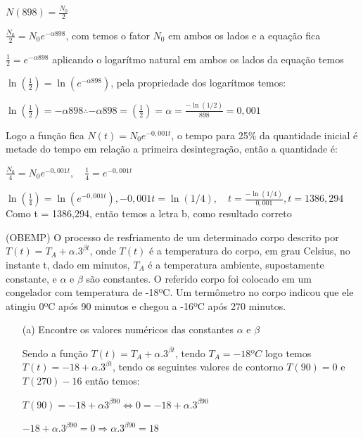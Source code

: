 \begin{multicols*}{2}
    $N(898) = \frac{N_0}{2}$

    $\frac{N_0}{2} = N_0 e^{- \alpha 898}$, com temos o fator $N_0$ em ambos os lados e a equação 			fica

    $\frac{1}{2} = e^{- \alpha 898}$ aplicando o logarítmo natural em ambos os lados da equação 			temos

    $\ln \left(\frac{1}{2} \right) = \ln \left( e^{- \alpha 898} \right)$, pela propriedade dos 			logarítmos temos:

    $\ln \left(\frac{1}{2} \right) =  - \alpha 898  \therefore
        - \alpha 898 =  \left(\frac{1}{2} \right) = \alpha = \frac{-\ln(1/2)}{898} = 0,001$

    Logo a função fica $N(t) = N_0 e^{-0,001t}$, o tempo para 25\% da quantidade inicial é metade 			do tempo em relação a primeira desintegração, então a quantidade é:



    $\frac{N_0}{4} = N_0 e^{-0,001 t}, \quad \frac{1}{4} = e^{-0,001t}$

    $\ln \left( \frac{1}{4} \right) = \ln \left( e^{-0,001t} \right),
        -0,001t = \ln( 1/4), \quad t = \frac{ - \ln( 1/4)}{ 0,001}, t = 1386,294
    $
    Como t = 1386,294, então temos a letra b, como resultado correto


    (OBEMP) O processo de resfriamento de um determinado corpo descrito por
    $T(t) = T_A + \alpha.3^{\beta t}$, onde $T(t)$ é a temperatura do corpo, em grau Celsius, no 			instante t, dado em minutos, $T_A$ é a temperatura ambiente, supostamente constante, e $\alpha$
    e $\beta$ são constantes. O referido corpo foi colocado em um congelador com temperatura de 			-18ºC. Um termômetro no corpo indicou que ele atingiu 0ºC após 90 minutos e chegou a 					-16ºC após 270 minutos.
    \begin{itemize}
        \item[(a)] Encontre os valores numéricos das constantes $\alpha$ e $\beta$

              Sendo a função $T(t) = T_A + \alpha.3^{\beta t}$, tendo $T_A = -18ºC$ logo temos
              $T(t) = -18 + \alpha.3^{\beta t}$, tendo os seguintes valores de contorno $T(90) = 0$ e
              $T(270) -16$ então temos:

              $T(90) = -18 + \alpha 3^{\beta 90} \Leftrightarrow 0 = -18 + \alpha .3^{\beta 90}$

              $-18 + \alpha .3^{\beta 90} = 0 \Rightarrow \alpha.3^{\beta 90} = 18$


\end{itemize}
\end{multicols*}
